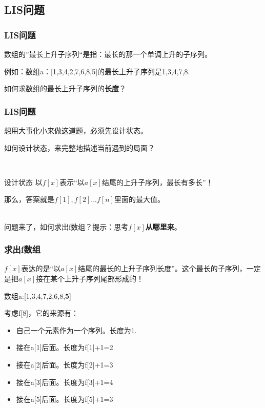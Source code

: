 \documentclass{beamer}
\begin{document}
\subsection{LIS问题}

\begin{frame}
    \frametitle{LIS问题}

    数组的”最长上升子序列“是指：最长的那一个单调上升的子序列。

    例如：数组a：[1,3,4,2,7,6,8,5]的最长上升子序列是1,3,4,7,8.

    如何求数组的最长上升子序列的\textbf{长度}？

\end{frame}

\begin{frame}
    \frametitle{LIS问题}

    想用大事化小来做这道题，必须先设计状态。

    如何设计状态，来完整地描述当前遇到的局面？
    \pause

    ~\\

    \begin{block}{设计状态}
        以$f[x]$表示“以$a[x]$结尾的上升子序列，最长有多长”！

        那么，答案就是$f[1],f[2]...f[n]$里面的最大值。

        ~\\

        问题来了，如何求出f数组？提示：思考$f[x]$\textbf{从哪里来}。

    \end{block}

\end{frame}

\begin{frame}
    \frametitle{求出f数组}
    
    $f[x]$表达的是“以$a[x]$结尾的最长的上升子序列长度”。这个最长的子序列，一定是把$a[x]$接在某个上升子序列尾部形成的！

    \begin{example}
        数组a:[1,3,4,7,2,6,8,\textbf{5}]

        考虑f[8]，它的来源有：
        \begin{itemize}
            \item 自己一个元素作为一个序列。长度为1.
            \item 接在a[1]后面。长度为f[1]+1=2
            \item 接在a[2]后面。长度为f[2]+1=3
            \item 接在a[3]后面。长度为f[3]+1=4
            \item 接在a[5]后面。长度为f[5]+1=3
        \end{itemize}
    \end{example}

\end{frame}
\end{document}

